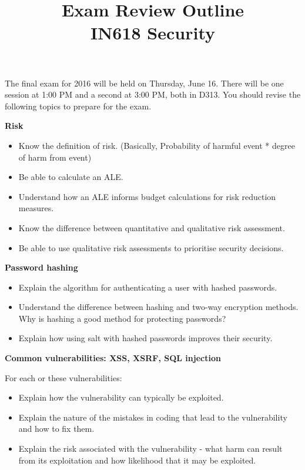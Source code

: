 \documentclass{article}
\begin{document}
\title{Exam Review Outline\\ IN618 Security}
\date{}
\maketitle

The final exam for 2016 will be held on Thursday, June 16. There will be one session at 1:00 PM and a second at 3:00 PM, both in D313. You should revise the following topics to prepare for the exam.

\textbf{Risk}

\begin{itemize}
	\item Know the definition of risk. (Basically, Probability of harmful event * degree of harm from event)
	\item Be able to calculate an ALE.
	\item Understand how an ALE informs budget calculations for risk reduction measures.
	\item Know the difference between quantitative and qualitative risk assessment.
	\item Be able to use qualitative risk assessments to prioritise security decisions.
\end{itemize}

\textbf{Password hashing}

\begin{itemize}
	\item Explain the algorithm for authenticating a user with hashed passwords.
	\item Understand the difference between hashing and two-way encryption methods. Why is hashing a good method for protecting passwords?
	\item Explain how using salt with hashed passwords improves their security.
\end{itemize}

\textbf{Common vulnerabilities: XSS, XSRF, SQL injection}

For each or these vulnerabilities:

\begin{itemize}
	\item Explain how the vulnerability can typically be exploited.
	\item Explain the nature of the mistakes in coding that lead to the vulnerability and how to fix them.
	\item Explain the risk associated with the vulnerability - what harm can result from its exploitation and how likelihood that it may be exploited. 
\end{itemize}
\end{document}
